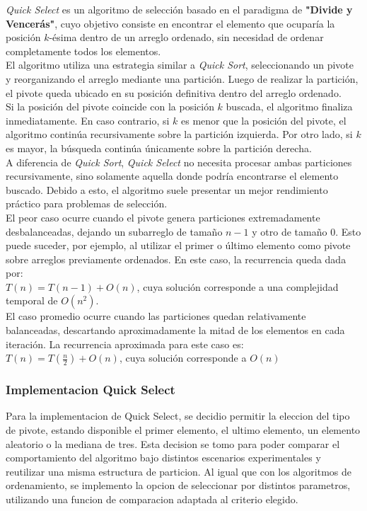 \textit{Quick Select} es un algoritmo de selección basado en el paradigma de \textbf{"Divide y Vencerás"}, cuyo objetivo consiste en encontrar el elemento que ocuparía 
la posición \(k\)-ésima dentro de un arreglo ordenado, sin necesidad de ordenar completamente todos los elementos. \\

El algoritmo utiliza una estrategia similar a \textit{Quick Sort}, seleccionando un pivote y reorganizando el arreglo mediante una partición. Luego de realizar la 
partición, el pivote queda ubicado en su posición definitiva dentro del arreglo ordenado. \\

Si la posición del pivote coincide con la posición \(k\) buscada, el algoritmo finaliza inmediatamente. En caso contrario, si \(k\) es menor que la posición del pivote, 
el algoritmo continúa recursivamente sobre la partición izquierda. Por otro lado, si \(k\) es mayor, la búsqueda continúa únicamente sobre la partición derecha. \\

A diferencia de \textit{Quick Sort}, \textit{Quick Select} no necesita procesar ambas particiones recursivamente, sino solamente aquella donde podría encontrarse 
el elemento buscado.  Debido a esto, el algoritmo suele presentar un mejor rendimiento práctico para problemas de selección. \\

El peor caso ocurre cuando el pivote genera particiones extremadamente desbalanceadas, dejando un subarreglo de tamaño \(n-1\) y otro de tamaño \(0\).  Esto puede 
suceder, por ejemplo, al utilizar el primer o último elemento como pivote sobre arreglos previamente ordenados.  En este caso, la recurrencia queda dada por: \\

$T(n) = T(n-1) + O(n)$, cuya solución corresponde a una complejidad temporal de $O(n^2)$. \\

El caso promedio ocurre cuando las particiones quedan relativamente balanceadas, descartando aproximadamente la mitad de los elementos en cada iteración. La 
recurrencia aproximada para este caso es: \\

$T(n) = T\left(\frac{n}{2}\right) + O(n)$, cuya solución corresponde a $O(n)$ \\


\subsubsection{Implementacion Quick Select}
Para la implementacion de Quick Select, se decidio permitir la eleccion del tipo de pivote, estando disponible el primer elemento, el ultimo elemento, un elemento 
aleatorio o la mediana de tres.  Esta decision se tomo para poder comparar el comportamiento del algoritmo bajo distintos escenarios experimentales y reutilizar una 
misma estructura de particion.  Al igual que con los algoritmos de ordenamiento, se implemento la opcion de seleccionar por distintos parametros, utilizando una 
funcion de comparacion adaptada al criterio elegido.

